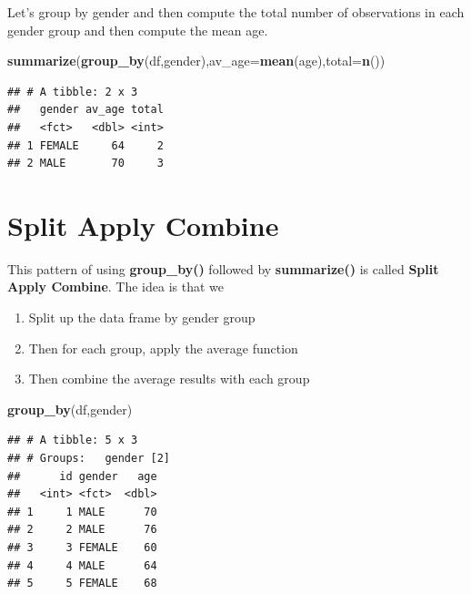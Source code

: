 \documentclass[]{book}
\newenvironment{Shaded}{\begin{snugshade}}{\end{snugshade}}
\newcommand{\DataTypeTok}[1]{\textcolor[rgb]{0.13,0.29,0.53}{#1}}
\newcommand{\KeywordTok}[1]{\textcolor[rgb]{0.13,0.29,0.53}{\textbf{#1}}}
\newcommand{\NormalTok}[1]{#1}
\providecommand{\tightlist}{%
  \setlength{\itemsep}{0pt}\setlength{\parskip}{0pt}}
\begin{document}
Let's group by gender and then compute the total number of observations in each gender group and then compute the mean age.

\begin{Shaded}
\begin{Highlighting}[]
\KeywordTok{summarize}\NormalTok{(}\KeywordTok{group_by}\NormalTok{(df,gender),}\DataTypeTok{av_age=}\KeywordTok{mean}\NormalTok{(age),}\DataTypeTok{total=}\KeywordTok{n}\NormalTok{())}
\end{Highlighting}
\end{Shaded}

\begin{verbatim}
## # A tibble: 2 x 3
##   gender av_age total
##   <fct>   <dbl> <int>
## 1 FEMALE     64     2
## 2 MALE       70     3
\end{verbatim}

\hypertarget{split-apply-combine}{%
\chapter{Split Apply Combine}\label{split-apply-combine}}

This pattern of using \textbf{group\_by()} followed by \textbf{summarize()}
is called \textbf{Split Apply Combine}. The idea is that we

\begin{enumerate}
\def\labelenumi{\arabic{enumi})}
\tightlist
\item
  Split up the data frame by gender group
\item
  Then for each group, apply the average function
\item
  Then combine the average results with each group
\end{enumerate}

\begin{Shaded}
\begin{Highlighting}[]
\KeywordTok{group_by}\NormalTok{(df,gender)}
\end{Highlighting}
\end{Shaded}

\begin{verbatim}
## # A tibble: 5 x 3
## # Groups:   gender [2]
##      id gender   age
##   <int> <fct>  <dbl>
## 1     1 MALE      70
## 2     2 MALE      76
## 3     3 FEMALE    60
## 4     4 MALE      64
## 5     5 FEMALE    68
\end{verbatim}
\end{document}
